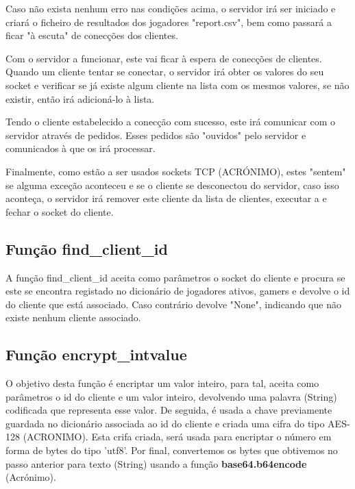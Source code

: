 \documentclass{report}
\begin{document}
Caso não exista nenhum erro nas condições acima, o servidor irá ser iniciado e criará o ficheiro de resultados dos jogadores "report.csv", bem como passará a ficar "à escuta" de conecções dos clientes.

Com o servidor a funcionar, este vai ficar à espera de conecções de clientes. Quando um cliente tentar se conectar, o servidor irá obter os valores do seu socket e verificar se já existe algum cliente na lista com os mesmos valores, se não existir, então irá adicioná-lo à lista.

Tendo o cliente estabelecido a conecção com sucesso, este irá comunicar com o servidor através de pedidos. Esses pedidos são "ouvidos" pelo servidor e comunicados à  que os irá processar.

Finalmente, como estão a ser usados sockets TCP (ACRÓNIMO), estes "sentem" se alguma exceção aconteceu e se o cliente se desconectou do servidor, caso isso aconteça, o servidor irá remover este cliente da lista de clientes, executar a  e fechar o socket do cliente.


\subsection{Função find\_client\_id}
\label{ssec:func_find_client_id}

A função find\_client\_id aceita como parâmetros o socket do cliente e procura se este se encontra registado no dicionário de jogadores ativos, gamers e devolve o id do cliente que está associado. Caso contrário devolve "None", indicando que não existe nenhum cliente associado.

\subsection{Função encrypt\_intvalue}
\label{ssec:func_encrypt_value_server}

O objetivo desta função é encriptar um valor inteiro, para tal, aceita como parâmetros o id do cliente e um valor inteiro, devolvendo uma palavra (String) codificada que representa esse valor. De seguida, é usada a chave previamente guardada no dicionário associada ao id do cliente e criada uma cifra do tipo AES-128 (ACRONIMO). Esta crifa criada, será usada para encriptar o número em forma de bytes do tipo 'utf8'. Por final, convertemos os bytes que obtivemos no passo anterior para texto (String) usando a função \textbf{base64.b64encode} (Acrónimo).
\end{document}
